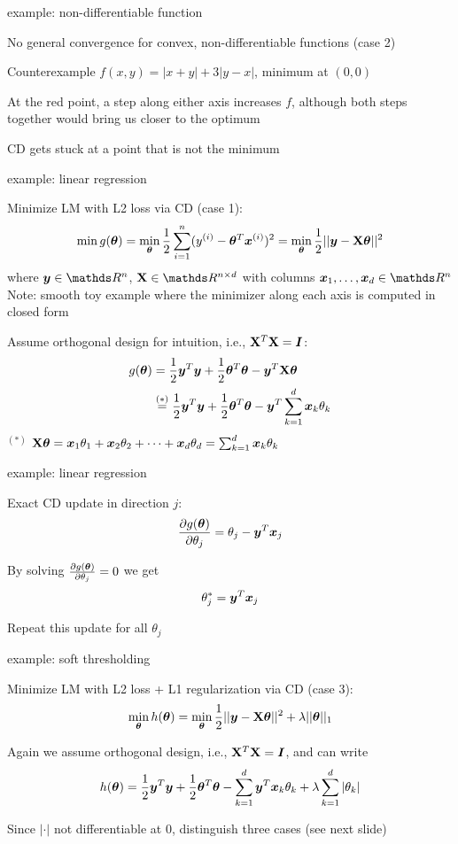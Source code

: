 \documentclass[11pt,compress,t,notes=noshow, xcolor=table]{beamer}
\begin{document}
\begin{framei}{example: non-differentiable function}
\item No general convergence for convex, non-differentiable functions (case 2)
\item Counterexample $f(x, y) = |x + y| + 3|y - x|$, minimum at $(0, 0)$
\item At the red point, a step along either axis increases $f$,
although both steps together would bring us closer to the optimum
\item CD gets stuck at a point that is not the minimum
\end{framei}


\begin{framei}{example: linear regression}
\item Minimize LM with L2 loss via CD (case 1):
$$\min g(\bm{\theta}) = \min_{\bm{\theta}} \frac{1}{2}\sum\limits_{i=1}^n (y^{(i)} - \bm{\theta}^T \bm{x}^{(i)})^2 = \min_{\bm{\theta}} \frac{1}{2}||\bm{y} - \mathbf{X} \bm{\theta}||^2 $$
where $\yv \in \R^n$, $\Xmat \in \R^{n \times d}$ with columns $\xv_1, \ldots, \xv_d \in \R^n$\\
{\footnotesize Note: smooth toy example where the minimizer along each axis is computed in closed form}
\item Assume orthogonal design for intuition, i.e., $\mathbf{X}^T \mathbf{X} = \bm{I}$:
\begin{align*}
g(\bm{\theta}) &= \frac{1}{2}\bm{y}^T \bm{y} + \frac{1}{2}\bm{\theta}^T \bm{\theta} - \bm{y}^T \mathbf{X} \bm{\theta}  \\
&\overset{(*)}{=} \frac{1}{2}\bm{y}^T \bm{y} + \frac{1}{2}\bm{\theta}^T \bm{\theta} - \bm{y}^T \sum_{k = 1}^d \bm{x}_k \theta_k
\end{align*}
$^{(*)}$ $\mathbf{X} \bm{\theta} = \bm{x}_1 \theta_1 + \bm{x}_2 \theta_2 + \cdots + \bm{x}_d \theta_d = \sum_{k = 1}^d \bm{x}_k \theta_k$
\end{framei}


\begin{framei}{example: linear regression}
\item Exact CD update in direction $j$:
$$\frac{\partial{g}(\bm{\theta})}{\partial \theta_j} = \theta_j - \bm{y}^T \bm{x}_j$$
\item By solving $\frac{\partial{g}(\bm{\theta})}{\partial \theta_j} = 0$ we get $$\theta_j^\ast = \bm{y}^T \bm{x}_j$$
\item Repeat this update for all $\theta_j$
\end{framei}


\begin{framei}{example: soft thresholding}
\item Minimize LM with L2 loss + L1 regularization via CD (case 3):
$$\min_{\bm{\theta}} h(\bm{\theta}) = \min_{\bm{\theta}} \frac{1}{2}||\bm{y} - \mathbf{X} \bm{\theta}||^2 + \lambda ||\bm{\theta}||_1$$
\item Again we assume orthogonal design, i.e., $\mathbf{X}^T \mathbf{X} = \bm{I}$, and can write
$$h(\bm{\theta}) = \frac{1}{2}\bm{y}^T \bm{y} + \frac{1}{2}\bm{\theta}^T \bm{\theta} - \sum_{k = 1}^d \bm{y}^T \bm{x}_k \theta_k + \lambda \sum_{k = 1}^d |\theta_k|$$
\item Since $|\cdot|$ not differentiable at $0$, distinguish three cases (see next slide)
\end{framei}
\end{document}
